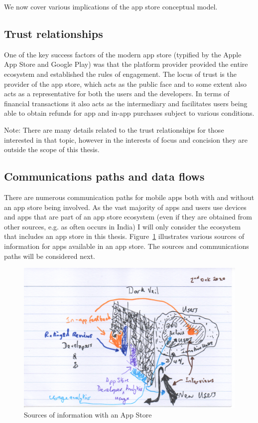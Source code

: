 We now cover various implications of the app store conceptual model.

\subsection{Trust relationships}
One of the key success factors of the modern app store (typified by the Apple App Store and Google Play) was that the platform provider provided the entire ecosystem and established the rules of engagement. The locus of trust is the provider of the app store, which acts as the public face and to some extent also acts as a representative for both the users and the developers. In terms of financial transactions it also acts as the intermediary and facilitates users being able to obtain refunds for app and in-app purchases subject to various conditions. 

Note: There are many details related to the trust relationships for those interested in that topic, however in the interests of focus and concision they are outside the scope of this thesis. 

\subsection{Communications paths and data flows}
There are numerous communication paths for mobile apps both with and without an app store being involved. As the vast majority of apps and users use devices and apps that are part of an app store ecosystem (even if they are obtained from other sources, e.g. as often occurs in India) I will only consider the ecosystem that includes an app store in this thesis. Figure~\ref{fig:sources-of-info-with-app-store-background-ch} illustrates various sources of information for apps available in an app store. The sources and communications paths will be considered next. 

\begin{figure}[htbp!]
    \centering
    \includegraphics[width=13cm]{images/rough-sketches/sources-of-information-with-app-store-1.png}
    \caption{Sources of information with an App Store}
    \label{fig:sources-of-info-with-app-store-background-ch}
\end{figure}

